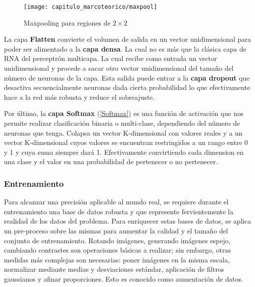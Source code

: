 

\begin{figure}[H]
    \centering
    \texttt{[image: capitulo\_marcoteorico/maxpool]}
    \caption{Maxpooling para regiones de $2 \times 2$}\label{fig:pool}
\end{figure}

La capa \textbf{Flatten} convierte el volumen de salida en un vector
unidimensional para poder ser alimentado a la \textbf{capa densa}. La cual no es
más que la clásica capa de RNA del perceptrón multicapa. La cual recibe como
entrada un vector unidimensional y procede a sacar otro vector unidimensional
del tamaño del número de neuronas de la capa. Esta salida puede entrar a la
\textbf{capa dropout} que desactiva secuencialmente neuronas dada cierta
probabilidad lo que efectivamente hace a la red más robusta y reduce el
sobreajuste.

Por último, la \textbf{capa Softmax} (\autoref{Softmax}) es una función de activación que nos
permite realizar clasificación binaria o multi-clase, dependiendo del número de
neuronas que tenga. Colapsa un vector K-dimensional con valores reales y a un
vector K-dimensional cuyos valores se encuentran restringidos a un rango entre 0
y 1 y cuya suma siempre dará 1. Efectivamente convirtiendo cada dimension en una
clase y el valor en una probabilidad de pertenecer o no pertenecer.


\subsubsection{Entrenamiento}

Para alcanzar una precisión aplicable al mundo real, se requiere durante el
entrenamiento una base de datos robusta y que represente fervientemente la
realidad de los datos del problema. Para enriquecer estas bases de datos, se
aplica un pre-proceso sobre las mismas para aumentar la calidad y el tamaño del
conjunto de entrenamiento. Rotando imágenes, generando imágenes espejo,
cambiando contrastes son operaciones básicas a realizar; sin embargo, otras
medidas más complejas son necesarias: poner imágenes en la misma escala,
normalizar mediante medias y desviaciones estándar, aplicación de filtros
gaussianos y afinar proporciones. Esto es conocido como aumentación de datos.

